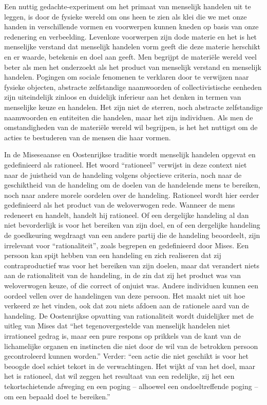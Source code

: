 Een nuttig gedachte-experiment om het primaat van menselijk handelen uit te leggen, is door de fysieke wereld om ons heen te zien als klei die we met onze handen in verschillende vormen en voorwerpen kunnen kneden op basis van onze redenering en verbeelding. Levenloze voorwerpen zijn dode materie en het is het menselijke verstand  dat menselijk handelen vorm geeft die deze materie herschikt en er waarde, betekenis en doel aan geeft. Men begrijpt de materiële wereld veel beter als men het onderzoekt als het product van menselijk verstand en menselijk handelen. Pogingen om sociale fenomenen te verklaren door te verwijzen naar fysieke objecten, abstracte zelfstandige naamwoorden of collectivistische eenheden zijn uiteindelijk zinloos en duidelijk inferieur aan het denken in termen van menselijke keuze en handelen. Het zijn niet de sterren, noch abstracte zelfstandige naamwoorden en entiteiten die handelen, maar het zijn individuen. Als men de omstandigheden van de materiële wereld wil begrijpen, is het het nuttigst om de acties te bestuderen van de mensen die haar vormen.

In de Miseseaanse en Oostenrijkse traditie wordt menselijk handelen opgevat en gedefinieerd als rationeel. Het woord “rationeel” verwijst in deze context niet naar de juistheid van de handeling volgens objectieve criteria, noch naar de geschiktheid van de handeling om de doelen van de handelende mens te bereiken, noch naar andere morele oordelen over de handeling. Rationeel wordt hier eerder gedefinieerd als het product van de weloverwogen rede. Wanneer de mens redeneert en handelt, handelt hij rationeel. Of een dergelijke handeling al dan niet bevorderlijk is voor het bereiken van zijn doel, en of een dergelijke handeling de goedkeuring wegdraagt van een andere partij die de handeling beoordeelt, zijn irrelevant voor \enquote{rationaliteit}, zoals begrepen en gedefinieerd door Mises. Een persoon kan spijt hebben van een handeling en zich realiseren dat zij contraproductief was voor het bereiken van zijn doelen, maar dat verandert niets aan de rationaliteit van de handeling, in de zin dat zij het product was van weloverwogen keuze, of die correct of onjuist was. Andere individuen kunnen een oordeel vellen over de handelingen van deze persoon. Het maakt niet uit hoe verkeerd ze het vinden, ook dat zou niets afdoen aan de rationele aard van de handeling. De Oostenrijkse opvatting van rationaliteit wordt duidelijker met de uitleg van Mises dat \enquote{het tegenovergestelde van menselijk handelen niet irrationeel gedrag is, maar een pure respons op prikkels van de kant van de lichamelijke organen en instincten die niet door de wil van de betrokken persoon gecontroleerd kunnen worden.} Verder: \enquote{een actie die niet geschikt is voor het beoogde doel schiet tekort in de verwachtingen. Het wijkt af van het doel, maar het is rationeel, dat wil zeggen het resultaat van een redelijke, zij het een  tekortschietende afweging en een poging – alhoewel een ondoeltreffende poging – om een bepaald doel te bereiken.}\autocite{6}

